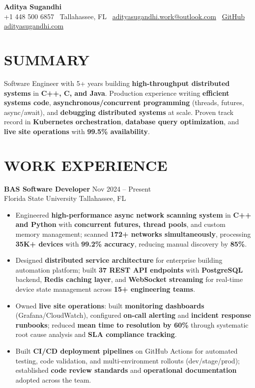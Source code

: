 \documentclass[letterpaper,10pt]{article}
\newcommand{\resumeItem}[1]{\item\small #1}
\newcommand{\resumeSubheading}[4]{
  \vspace{6pt}
  \noindent
  \textbf{#1} \hfill {\footnotesize #2} \\
  [-1pt]
  \noindent
  \small #3 \hfill {\small #4}
  \vspace{3pt}
}
\newcommand{\resumeItemsStart}{\vspace{-2pt}\begin{itemize}}
\newcommand{\resumeItemsEnd}{\end{itemize}\vspace{6pt}}
\begin{document}
\begin{center}
{\huge\textbf{Aditya Sugandhi}} \\
+1 448 500 6857 \textbar\ \textcolor{metablue}{Tallahassee, FL} \textbar\
\href{mailto:adityasugandhi.work@outlook.com}{adityasugandhi.work@outlook.com} \textbar\
\href{https://github.com/adityasugandhi}{GitHub}
\textbar \href{https://adityasugandhi.com}{adityasugandhi.com}
\end{center}
\vspace{-12pt}

\section{\textcolor{metablue}{SUMMARY}}
\small
\vspace{-6pt}
Software Engineer with 5+ years building \textbf{high-throughput distributed systems} in \textbf{C++, C, and Java}. Production experience writing \textbf{efficient systems code}, \textbf{asynchronous/concurrent programming} (threads, futures, async/await), and \textbf{debugging distributed systems} at scale. Proven track record in \textbf{Kubernetes orchestration}, \textbf{database query optimization}, and \textbf{live site operations} with \textbf{99.5\% availability}.

\vspace{-9pt}

\section{\textcolor{metablue}{WORK EXPERIENCE}}
\vspace{-12pt}

\resumeSubheading
{BAS Software Developer}{Nov 2024 -- Present}
{Florida State University}{Tallahassee, FL}
\resumeItemsStart
\resumeItem{Engineered \textbf{high-performance async network scanning system} in \textbf{C++ and Python} with \textbf{concurrent futures, thread pools}, and custom memory management; scanned \textbf{172+ networks simultaneously}, processing \textbf{35K+ devices} with \textbf{99.2\% accuracy}, reducing manual discovery by \textbf{85\%}.}
\resumeItem{Designed \textbf{distributed service architecture} for enterprise building automation platform; built \textbf{37 REST API endpoints} with \textbf{PostgreSQL} backend, \textbf{Redis caching layer}, and \textbf{WebSocket streaming} for real-time device state management across \textbf{15+ engineering teams}.}
\resumeItem{Owned \textbf{live site operations}: built \textbf{monitoring dashboards} (Grafana/CloudWatch), configured \textbf{on-call alerting} and \textbf{incident response runbooks}; reduced \textbf{mean time to resolution by 60\%} through systematic root cause analysis and \textbf{SLA compliance tracking}.}
\resumeItem{Built \textbf{CI/CD deployment pipelines} on GitHub Actions for automated testing, code validation, and multi-environment rollouts (dev/stage/prod); established \textbf{code review standards} and \textbf{operational documentation} adopted across the team.}
\resumeItemsEnd
\vspace{-12pt}
\end{document}
